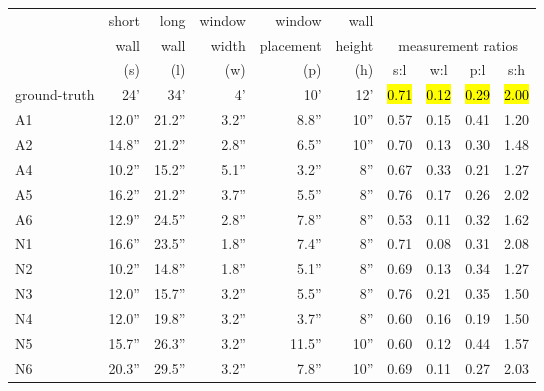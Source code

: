 \begin{table}[b]
\vspace{-0.1in}
\begin{center}
\begin{footnotesize}
\begin{tabular}{@{}l@{~~}|@{~~}r@{~~~}r@{~~~}r@{~~~}r@{~~~}r@{~~}|@{~~}c@{~~~}c@{~~~}c@{~~~}c@{}} 
~       &  {\tiny short}   & {\tiny long}    & {\tiny window}  & {\tiny window} &  {\tiny wall}      &  & & & \\
~       &  {\tiny wall}    & {\tiny wall}     & {\tiny width}   & {\tiny placement} &  {\tiny height}  &  \multicolumn{4}{c}{{\tiny measurement ratios}} \\ 
~       &  (s)     &  (l)     & (w)     & (p)     &  (h)  &  s:l  &  w:l  &  p:l & s:h \\ \hline
{\tiny ground-truth}  &  24'     &  34'     &  4'     &  10'    &   12'   &\hl{0.71} &\hl{0.12} &\hl{0.29} &\hl{2.00} \\ 
\hline
A1      &  12.0''  &  21.2''  &  3.2''  &  8.8''  &   10''  &  0.57    &  0.15    &  0.41  &  1.20 \\ 
A2      &  14.8''  &  21.2''  &  2.8''  &  6.5''  &   10''  &  0.70    &  0.13    &  0.30  &  1.48 \\ 
A4      &  10.2''  &  15.2''  &  5.1''  &  3.2''  &    8''  &  0.67    &  0.33    &  0.21  &  1.27 \\ 
A5      &  16.2''  &  21.2''  &  3.7''  &  5.5''  &    8''  &  0.76    &  0.17    &  0.26  &  2.02 \\ 
A6      &  12.9''  &  24.5''  &  2.8''  &  7.8''  &    8''  &  0.53    &  0.11    &  0.32  &  1.62 \\ 
N1      &  16.6''  &  23.5''  &  1.8''  &  7.4''  &    8''  &  0.71    &  0.08    &  0.31  &  2.08 \\ 
N2      &  10.2''  &  14.8''  &  1.8''  &  5.1''  &    8''  &  0.69    &  0.13    &  0.34  &  1.27 \\ 
N3      &  12.0''  &  15.7''  &  3.2''  &  5.5''  &    8''  &  0.76    &  0.21    &  0.35  &  1.50 \\ 
N4      &  12.0''  &  19.8''  &  3.2''  &  3.7''  &    8''  &  0.60    &  0.16    &  0.19  &  1.50 \\ 
N5      &  15.7''  &  26.3''  &  3.2''  & 11.5''  &   10''  &  0.60    &  0.12    &  0.44  &  1.57 \\ 
N6      &  20.3''  &  29.5''  &  3.2''  &  7.8''  &   10''  &  0.69    &  0.11    &  0.27  &  2.03 \\ 

\end{tabular}
\end{footnotesize}
\end{center}
\end{table}
